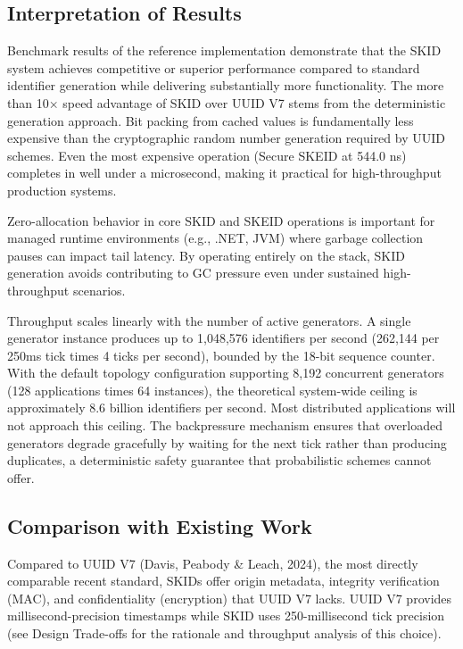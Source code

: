 \documentclass[fleqn,10pt,lineno]{wlpeerj}
\begin{document}
\subsection{Interpretation of Results}\label{interpretation-of-results}

Benchmark results of the reference implementation demonstrate that the
SKID system achieves competitive or superior performance compared to
standard identifier generation while delivering substantially more
functionality. The more than 10× speed advantage of SKID over UUID V7
stems from the deterministic generation approach. Bit packing from
cached values is fundamentally less expensive than the cryptographic
random number generation required by UUID schemes. Even the most
expensive operation (Secure SKEID at 544.0 ns) completes in well under a
microsecond, making it practical for high-throughput production systems.

Zero-allocation behavior in core SKID and SKEID operations is important
for managed runtime environments (e.g., .NET, JVM) where garbage
collection pauses can impact tail latency. By operating entirely on the
stack, SKID generation avoids contributing to GC pressure even under
sustained high-throughput scenarios.

Throughput scales linearly with the number of active generators. A
single generator instance produces up to 1,048,576 identifiers per
second (262,144 per 250ms tick times 4 ticks per second), bounded by the
18-bit sequence counter. With the default topology configuration
supporting 8,192 concurrent generators (128 applications times 64
instances), the theoretical system-wide ceiling is approximately 8.6
billion identifiers per second. Most distributed applications will not
approach this ceiling. The backpressure mechanism ensures that
overloaded generators degrade gracefully by waiting for the next tick
rather than producing duplicates, a deterministic safety guarantee that
probabilistic schemes cannot offer.

\subsection{Comparison with Existing
Work}\label{comparison-with-existing-work}

Compared to UUID V7 (Davis, Peabody \& Leach, 2024), the most directly
comparable recent standard, SKIDs offer origin metadata, integrity
verification (MAC), and confidentiality (encryption) that UUID V7 lacks.
UUID V7 provides millisecond-precision timestamps while SKID uses
250-millisecond tick precision (see Design Trade-offs for the rationale
and throughput analysis of this choice).
\end{document}

